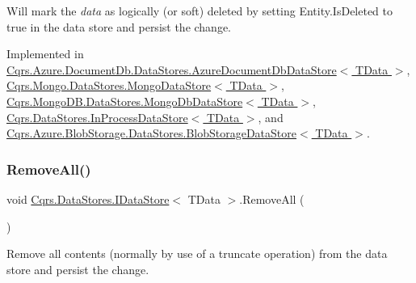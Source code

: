 Will mark the {\itshape data}  as logically (or soft) deleted by setting Entity.\+Is\+Deleted to true in the data store and persist the change. 



Implemented in \hyperlink{classCqrs_1_1Azure_1_1DocumentDb_1_1DataStores_1_1AzureDocumentDbDataStore_abf9bcf75e8e0e1ec86155bf4da1a7b7a_abf9bcf75e8e0e1ec86155bf4da1a7b7a}{Cqrs.\+Azure.\+Document\+Db.\+Data\+Stores.\+Azure\+Document\+Db\+Data\+Store$<$ T\+Data $>$}, \hyperlink{classCqrs_1_1Mongo_1_1DataStores_1_1MongoDataStore_a64003d01de3ac6ffd0e41bb7f572bf96_a64003d01de3ac6ffd0e41bb7f572bf96}{Cqrs.\+Mongo.\+Data\+Stores.\+Mongo\+Data\+Store$<$ T\+Data $>$}, \hyperlink{classCqrs_1_1MongoDB_1_1DataStores_1_1MongoDbDataStore_a14b43546e8d1e1832358e1cf2f8535f1_a14b43546e8d1e1832358e1cf2f8535f1}{Cqrs.\+Mongo\+D\+B.\+Data\+Stores.\+Mongo\+Db\+Data\+Store$<$ T\+Data $>$}, \hyperlink{classCqrs_1_1DataStores_1_1InProcessDataStore_a43a93c614a403181e0641106ca9509d6_a43a93c614a403181e0641106ca9509d6}{Cqrs.\+Data\+Stores.\+In\+Process\+Data\+Store$<$ T\+Data $>$}, and \hyperlink{classCqrs_1_1Azure_1_1BlobStorage_1_1DataStores_1_1BlobStorageDataStore_af054d4134671d66981c4d91df5c1d481_af054d4134671d66981c4d91df5c1d481}{Cqrs.\+Azure.\+Blob\+Storage.\+Data\+Stores.\+Blob\+Storage\+Data\+Store$<$ T\+Data $>$}.

\mbox{\label{interfaceCqrs_1_1DataStores_1_1IDataStore_aead8d7a39a717d29af05daf7b64bea94_aead8d7a39a717d29af05daf7b64bea94}} 
\subsubsection{\texorpdfstring{Remove\+All()}{RemoveAll()}}
{\footnotesize\ttfamily void \hyperlink{interfaceCqrs_1_1DataStores_1_1IDataStore}{Cqrs.\+Data\+Stores.\+I\+Data\+Store}$<$ T\+Data $>$.Remove\+All (\begin{DoxyParamCaption}{ }\end{DoxyParamCaption})}



Remove all contents (normally by use of a truncate operation) from the data store and persist the change. 



